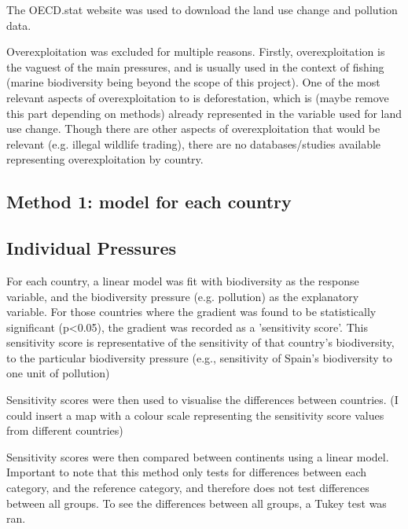 \documentclass[11pt, a4paper, titlepage]{article}
\begin{document}
	The OECD.stat website was used to download the land use change and pollution data. \newline
	
	Overexploitation was excluded for multiple reasons. Firstly, overexploitation is the vaguest of the main pressures, and is usually used in the context of fishing (marine biodiversity being beyond the scope of this project). One of the most relevant aspects of overexploitation to is deforestation, which is (maybe remove this part depending on methods) already represented in the variable used for land use change. Though there are other aspects of overexploitation that would be relevant (e.g. illegal wildlife trading), there are no databases/studies available representing overexploitation by country.

	\subsection*{Method 1: model for each country}

	\subsection*{Individual Pressures}
	
	For each country, a linear model was fit with biodiversity as the response variable, and the biodiversity pressure (e.g. pollution) as the explanatory variable. For those countries where the gradient was found to be statistically significant (p<0.05), the gradient was recorded as a 'sensitivity score'. This sensitivity score is representative of the sensitivity of that country's biodiversity, to the particular biodiversity pressure (e.g., sensitivity of Spain's biodiversity to one unit of pollution) \newline
	
	Sensitivity scores were then used to visualise the differences between countries. (I could insert a map with a colour scale representing the sensitivity score values from different countries) \newline
	
	Sensitivity scores were then compared between continents using a linear model. Important to note that this method only tests for differences between each category, and the reference category, and therefore does not test differences between all groups. To see the differences between all groups, a Tukey test was ran.  \newline
	
\end{document}
